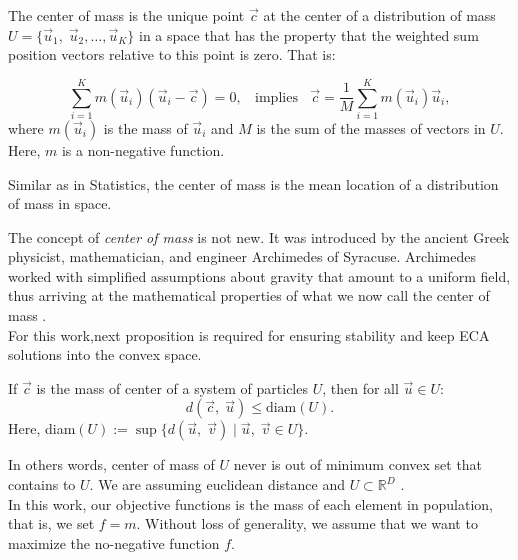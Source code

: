 \documentclass[graybox]{svmult}
\begin{document}
\begin{definition}
	The center of mass is the unique point $\vec{c}$ at the center of a distribution of mass $U = \{\vec{u}_1,\; \vec{u}_2 , \ldots , \vec{u}_K \}$ in a space that has the property that the weighted sum position vectors relative to this point is zero. That is:

	\begin{equation}
		\sum_{i = 1}^K m(\vec{u}_i) (\vec{u}_i - \vec{c}) = 0, \;\; \text{ implies } \;\; 
		\vec{c} = \dfrac{1}{M} \sum_{i = 1}^K  m(\vec{u}_i)  \vec{u}_i,
		\label{eq:masscenter}
	\end{equation}
	where $m(\vec{u}_i)$ is the mass of $\vec{u}_i$ and  $M$ is the sum of the masses of vectors in $U$. Here, $m$ is a non-negative function.
\end{definition}
%
%
\begin{note}
Similar as in Statistics, the center of mass is the mean location of a distribution of mass in space.
\end{note}
% 
The concept of \textit{center of mass} is not new. It was introduced by the ancient Greek physicist, mathematician, and engineer Archimedes of Syracuse. Archimedes worked with simplified assumptions about gravity that amount to a uniform field, thus arriving at the mathematical properties of what we now call the center of mass \cite{kleppner73}.\\

For this work,next proposition is required for ensuring stability and keep ECA solutions into the convex space.

\begin{proposition}
	If $\vec{c}$ is the mass of center of a system of particles $U$, then  for all $ \vec{u}\in U $:
	$$  d(\vec{c},\; \vec{u} )  \leq \text{diam}(U). $$
	Here, diam$(U) := \sup\{ d(\vec{u},\; \vec{v} ) \; | \; \vec{u} ,\; \vec{v} \in U \}$.
\end{proposition}
%
\noindent
In others words, center of mass of $U$ never is out of minimum	convex set that contains to $U$. We are assuming euclidean distance and $U \subset \mathbb{R}^D$ \cite{rudin}.\\

%
% 
%

In this work, our objective functions is the mass of each element in population, that is, we set $f = m$. Without loss of generality, we assume that we want to maximize the no-negative function $f$.
\end{document}
